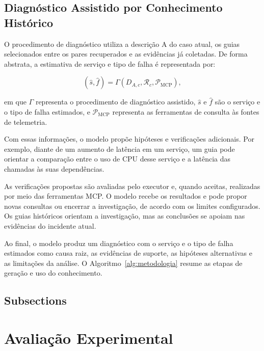 \documentclass[12pt]{article}
\begin{document}
\subsection{Diagnóstico Assistido por Conhecimento Histórico}

O procedimento de diagnóstico utiliza a descrição A do caso atual, os guias
selecionados entre os pares recuperados e as evidências já coletadas. De
forma abstrata, a estimativa de serviço e tipo de falha é representada por:

\begin{equation}
  (\hat{s},\hat{f}) =
  \Gamma(D_{A,c},\mathcal{R}_c,\mathcal{P}_{\text{MCP}}),
\end{equation}

em que $\Gamma$ representa o procedimento de diagnóstico assistido,
$\hat{s}$ e $\hat{f}$ são o serviço e o tipo de falha estimados, e
$\mathcal{P}_{\text{MCP}}$ representa as ferramentas de consulta às fontes
de telemetria.

Com essas informações, o modelo propõe hipóteses e verificações adicionais.
Por exemplo, diante de um aumento de latência em um serviço, um guia pode
orientar a comparação entre o uso de CPU desse serviço e a latência das
chamadas às suas dependências.

As verificações propostas são avaliadas pelo executor e, quando aceitas,
realizadas por meio das ferramentas MCP. O modelo recebe os resultados e
pode propor novas consultas ou encerrar a investigação, de acordo com os
limites configurados. Os guias históricos orientam a investigação, mas as
conclusões se apoiam nas evidências do incidente atual.

Ao final, o modelo produz um diagnóstico com o serviço e o tipo de falha
estimados como causa raiz, as evidências de suporte, as hipóteses alternativas
e as limitações da análise. O Algoritmo~\ref{alg:metodologia} resume as etapas
de geração e uso do conhecimento.





\subsection{Subsections}



\section{Avaliação Experimental}
\end{document}
